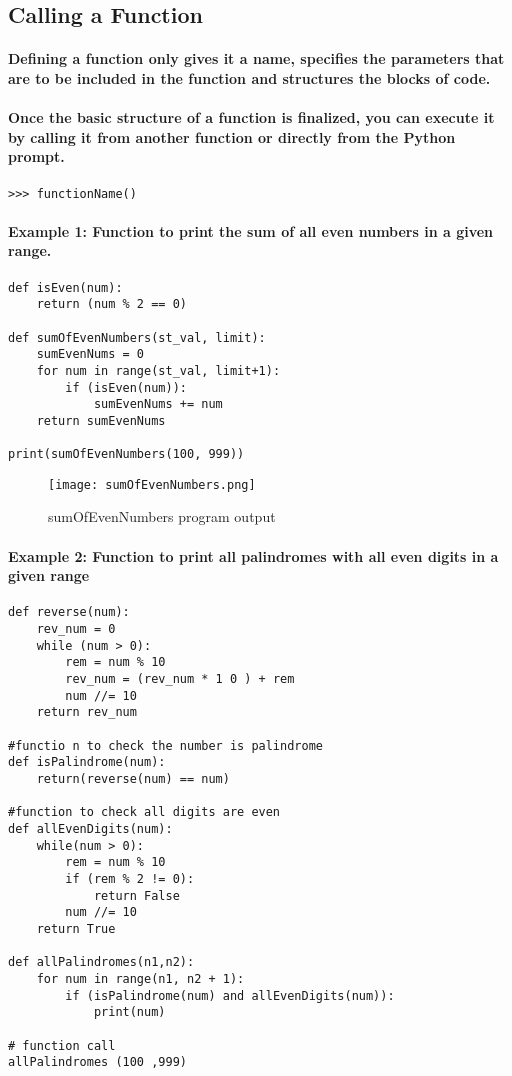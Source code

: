 \documentclass{book}
\begin{document}
\subsection*{Calling a Function}
\paragraph{Defining a function only gives it a name, specifies the parameters that are to be included in the
function and structures the blocks of code.}
\paragraph{Once the basic structure of a function is finalized, you can execute it by calling it from another
function or directly from the Python prompt.}
\begin{verbatim}
>>> functionName()
\end{verbatim}

\paragraph{Example 1: Function to print the sum of all even numbers in a given range.}

\begin{verbatim}
def isEven(num):
    return (num % 2 == 0)

def sumOfEvenNumbers(st_val, limit):
    sumEvenNums = 0
    for num in range(st_val, limit+1):
        if (isEven(num)):
            sumEvenNums += num
    return sumEvenNums
    
print(sumOfEvenNumbers(100, 999))
\end{verbatim}

\begin{figure}[h!]
  \texttt{[image: sumOfEvenNumbers.png]}
  \caption{sumOfEvenNumbers program output}
  \label{fig:sumOfEvenNumbers}
\end{figure}

\paragraph{Example 2: Function to print all palindromes with all even digits in a given range}

\begin{verbatim}
def reverse(num):
    rev_num = 0
    while (num > 0):
        rem = num % 10
        rev_num = (rev_num * 1 0 ) + rem
        num //= 10
    return rev_num

#functio n to check the number is palindrome 
def isPalindrome(num):
    return(reverse(num) == num)

#function to check all digits are even
def allEvenDigits(num):
    while(num > 0):
        rem = num % 10
        if (rem % 2 != 0):
            return False
        num //= 10
    return True

def allPalindromes(n1,n2):
    for num in range(n1, n2 + 1):
        if (isPalindrome(num) and allEvenDigits(num)):
            print(num)

# function call
allPalindromes (100 ,999)
\end{verbatim}
\end{document}
